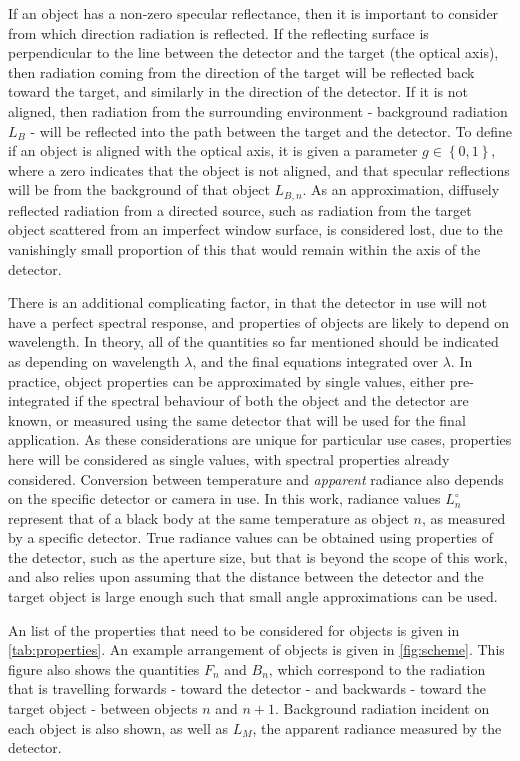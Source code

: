 \documentclass[11pt,a4paper]{article}
\begin{document}
If an object has a non-zero specular reflectance, then it is important to consider from which direction radiation is reflected. If the reflecting surface is perpendicular to the line between the detector and the target (the optical axis), then radiation coming from the direction of the target will be reflected back toward the target, and similarly in the direction of the detector. If it is not aligned, then radiation from the surrounding environment - background radiation $ L_B $ - will be reflected into the path between the target and the detector. To define if an object is aligned with the optical axis, it is given a parameter $ g \in \left\{0,1\right\}$, where a zero indicates that the object is not aligned, and that specular reflections will be from the background of that object $ L_{B,n} $. As an approximation, diffusely reflected radiation from a directed source, such as radiation from the target object scattered from an imperfect window surface, is considered lost, due to the vanishingly small proportion of this that would remain within the axis of the detector.

There is an additional complicating factor, in that the detector in use will not have a perfect spectral response, and properties of objects are likely to depend on wavelength. In theory, all of the quantities so far mentioned should be indicated as depending on wavelength $ \lambda $, and the final equations integrated over $ \lambda $. In practice, object properties can be approximated by single values, either pre-integrated if the spectral behaviour of both the object and the detector are known, or measured using the same detector that will be used for the final application. As these considerations are unique for particular use cases, properties here will be considered as single values, with spectral properties already considered. Conversion between temperature and \emph{apparent} radiance also depends on the specific detector or camera in use. In this work, radiance values $ L^\circ_n $ represent that of a black body at the same temperature as object $ n $, as measured by a specific detector. True radiance values can be obtained using properties of the detector, such as the aperture size, but that is beyond the scope of this work, and also relies upon assuming that the distance between the detector and the target object is large enough such that small angle approximations can be used.

An list of the properties that need to be considered for objects is given in \cref{tab:properties}. An example arrangement of objects is given in \cref{fig:scheme}. This figure also shows the quantities $ F_n $ and $ B_n $, which correspond to the radiation that is travelling forwards - toward the detector - and backwards - toward the target object - between objects $ n $ and $ n+1 $. Background radiation incident on each object is also shown, as well as $ L_M $, the apparent radiance measured by the detector.
\end{document}
